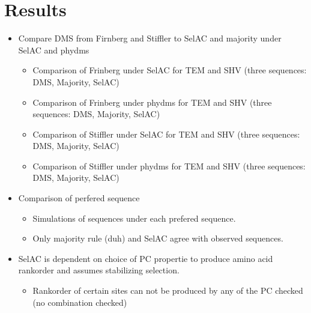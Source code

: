 \documentclass[12pt]{article}
\begin{document}
\section*{Results}
\begin{itemize}
	\item Compare DMS from Firnberg and Stiffler to SelAC and majority under SelAC and phydms
	\begin{itemize}
		\item Comparison of Frinberg under SelAC for TEM and SHV (three sequences: DMS, Majority, SelAC)
		\item Comparison of Frinberg under phydms for TEM and SHV (three sequences: DMS, Majority, SelAC)
		\item Comparison of Stiffler under SelAC for TEM and SHV (three sequences: DMS, Majority, SelAC)
		\item Comparison of Stiffler under phydms for TEM and SHV (three sequences: DMS, Majority, SelAC)
	\end{itemize}
	\item Comparison of perfered sequence
	\begin{itemize}
		\item Simulations of sequences under each prefered sequence.
		\item Only majority rule (duh) and SelAC agree with observed sequences. 
	\end{itemize} 
	\item SelAC is dependent on choice of PC propertie to produce amino acid rankorder and assumes stabilizing selection. 
	\begin{itemize}
		\item Rankorder of certain sites can not be produced by any of the PC checked (no combination checked)
	\end{itemize}
\end{itemize}
\end{document}
